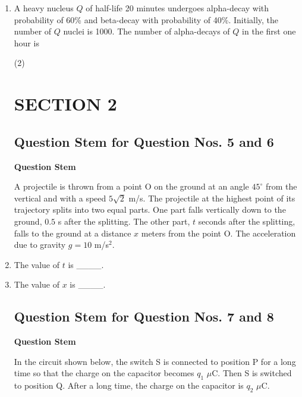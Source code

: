 \documentclass{article}
\begin{document}
\begin{enumerate}
    \item A heavy nucleus \(Q\) of half-life 20 minutes undergoes alpha-decay with probability of 60\% and beta-decay with probability of 40\%. Initially, the number of \(Q\) nuclei is 1000. The number of alpha-decays of \(Q\) in the first one hour is
        \begin{tasks}(2)
        \end{tasks}




\section*{SECTION 2}


\subsection*{Question Stem for Question Nos. 5 and 6}

\textbf{Question Stem}

A projectile is thrown from a point O on the ground at an angle $45^\circ$ from the vertical and with a speed $5\sqrt{2}$ m/s. The projectile at the highest point of its trajectory splits into two equal parts. One part falls vertically down to the ground, $0.5$ s after the splitting. The other part, $t$ seconds after the splitting, falls to the ground at a distance $x$ meters from the point O. The acceleration due to gravity $g = 10$ m/s$^2$.


    \item The value of $t$ is \_\_\_\_.
    \item The value of $x$ is \_\_\_\_.


\subsection*{Question Stem for Question Nos. 7 and 8}

\textbf{Question Stem}

In the circuit shown below, the switch S is connected to position P for a long time so that the charge on the capacitor becomes $q_1$ $\mu$C. Then S is switched to position Q. After a long time, the charge on the capacitor is $q_2$ $\mu$C.
\begin{center}
\end{center}


\end{enumerate}
\end{document}
